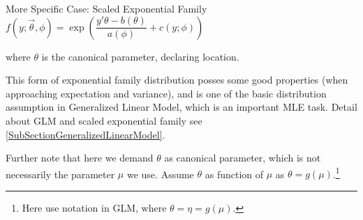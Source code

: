     
\begin{point}
    More Specific Case: Scaled Exponential Family $ f(y;\vec{\theta },\phi ) =\exp\left( \dfrac{y'\theta -b(\theta )}{a(\phi)}+c(y;\phi ) \right) $
\end{point}

    where $ \theta  $ is the canonical parameter, declaring location.

    This form of exponential family distribution posses some good properties (when approaching expectation and variance), and is one of the basic distribution assumption in Generalized Linear Model, which is an important MLE task. Detail about GLM and scaled exponential family see \autoref{SubSectionGeneralizedLinearModel}.

    Further note that here we demand $ \theta  $ as canonical parameter, which is not necessarily the parameter $ \mu  $ we use. Assume $ \theta  $ as function of $ \mu  $ as $ \theta =g(\mu ) $.\footnote{Here use notation in GLM, where $ \theta =\eta=g(\mu ) $.}

